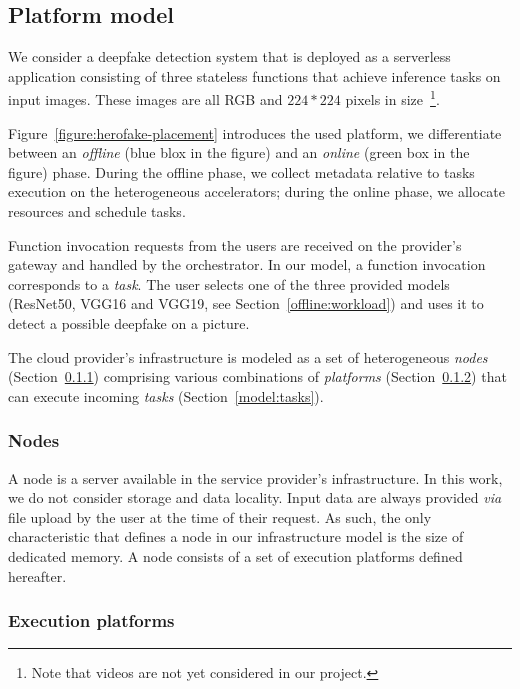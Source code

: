 \subsection{Platform model}

We consider a deepfake detection system that is deployed as a serverless application consisting of three stateless functions that achieve inference tasks on input images. These images are all RGB and $224 * 224$ pixels in size~\footnote{Note that videos are not yet considered in our project.}.

Figure~\ref{figure:herofake-placement} introduces the used platform, we differentiate between an \textit{offline} (blue blox in the figure) and an \textit{online} (green box in the figure) phase. During the offline phase, we collect metadata relative to tasks execution on the heterogeneous accelerators; during the online phase, we allocate resources and schedule tasks.

Function invocation requests from the users are received on the provider's gateway and handled by the orchestrator. In our model, a function invocation corresponds to a \textit{task}. The user selects one of the three provided models (ResNet50, VGG16 and VGG19, see Section~\ref{offline:workload}) and uses it to detect a possible deepfake on a picture.

The cloud provider's infrastructure is modeled as a set of heterogeneous \textit{nodes} (Section~\ref{model:nodes}) comprising various combinations of \textit{platforms} (Section~\ref{model:platforms}) that can execute incoming \textit{tasks} (Section~\ref{model:tasks}). 

\subsubsection{Nodes} \label{model:nodes}
A node is a server available in the service provider's infrastructure. In this work, we do not consider storage and data locality. Input data are always provided \textit{via} file upload by the user at the time of their request.
As such, the only characteristic that defines a node in our infrastructure model is the size of dedicated memory. A node consists of a set of execution platforms defined hereafter.

\subsubsection{Execution platforms} \label{model:platforms}

